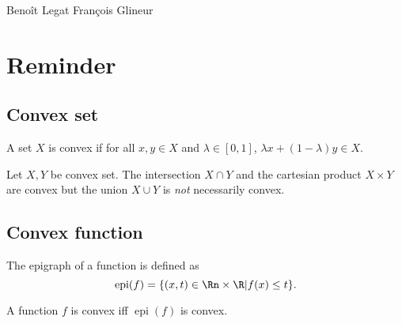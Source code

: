 

\usepackage{pifont}
\usepackage{diagbox}
\usepackage[normalem]{ulem}
\newcommand{\cmark}{\ding{51}}%
\newcommand{\xmark}{\ding{55}}%

\DeclareMathOperator{\epi}{epi}
\DeclareMathOperator{\conv}{conv}
\DeclareMathOperator{\dom}{conv}

{Benoît Legat}
{François Glineur}

\section{Reminder}
\subsection{Convex set}
\begin{mydef}
  A set $X$ is convex if for all $x,y \in X$ and $\lambda \in [0,1]$,
  $\lambda x + (1-\lambda) y \in X$.
\end{mydef}

\begin{myprop}
  Let $X,Y$ be convex set.
  The intersection $X \cap Y$ and the cartesian product $X \times Y$ are convex
  but the union $X \cup Y$ is \emph{not} necessarily convex.
\end{myprop}

\subsection{Convex function}
\begin{mydef}[Epigraph]
  The epigraph of a function is defined as
  \[ \epi(f) = \{(x,t) \in \Rn \times \R | f(x) \leq t\}. \]
\end{mydef}

\begin{mydef}
  A function $f$ is convex iff $\epi(f)$ is convex.
\end{mydef}

